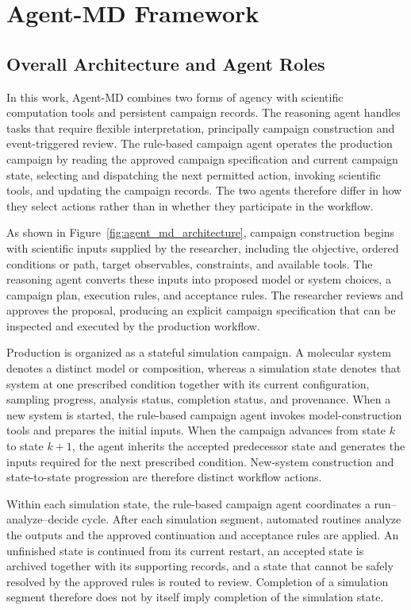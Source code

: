 \section{Agent-MD Framework}

\subsection{Overall Architecture and Agent Roles}
In this work, Agent-MD combines two forms of agency with scientific computation tools and persistent campaign records. The reasoning agent handles tasks that require flexible interpretation, principally campaign construction and event-triggered review. The rule-based campaign agent operates the production campaign by reading the approved campaign specification and current campaign state, selecting and dispatching the next permitted action, invoking scientific tools, and updating the campaign records. The two agents therefore differ in how they select actions rather than in whether they participate in the workflow.

As shown in Figure~\ref{fig:agent_md_architecture}, campaign construction begins with scientific inputs supplied by the researcher, including the objective, ordered conditions or path, target observables, constraints, and available tools. The reasoning agent converts these inputs into proposed model or system choices, a campaign plan, execution rules, and acceptance rules. The researcher reviews and approves the proposal, producing an explicit campaign specification that can be inspected and executed by the production workflow.

Production is organized as a stateful simulation campaign. A molecular system denotes a distinct model or composition, whereas a simulation state denotes that system at one prescribed condition together with its current configuration, sampling progress, analysis status, completion status, and provenance. When a new system is started, the rule-based campaign agent invokes model-construction tools and prepares the initial inputs. When the campaign advances from state $k$ to state $k+1$, the agent inherits the accepted predecessor state and generates the inputs required for the next prescribed condition. New-system construction and state-to-state progression are therefore distinct workflow actions.

Within each simulation state, the rule-based campaign agent coordinates a run--analyze--decide cycle. After each simulation segment, automated routines analyze the outputs and the approved continuation and acceptance rules are applied. An unfinished state is continued from its current restart, an accepted state is archived together with its supporting records, and a state that cannot be safely resolved by the approved rules is routed to review. Completion of a simulation segment therefore does not by itself imply completion of the simulation state.


